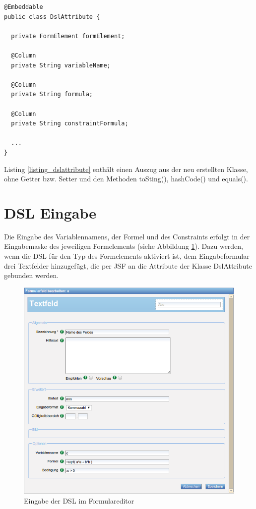 \begin{lstlisting}[float = htbp,caption={Embedded DslAttribute },label=listing_dslattribute]
@Embeddable
public class DslAttribute {

  private FormElement formElement;
  
  @Column
  private String variableName;

  @Column
  private String formula;

  @Column
  private String constraintFormula;

  ...
}
\end{lstlisting}


Listing \ref{listing_dslattribute} enthält einen Auszug aus der neu erstellten Klasse, ohne Getter bzw. Setter und den Methoden toSting(), hashCode() und equals().

\section{DSL Eingabe}
\label{implementierung_dsl_eingabe}

Die Eingabe des Variablennamens, der Formel und des Constraints erfolgt in der Eingabemaske des jeweiligen Formelements (siehe Abbildung \ref{abb_screenshot_spics_eingabe}). Dazu werden, wenn die DSL für den Typ des Formelements aktiviert ist, dem Eingabeformular drei Textfelder hinzugefügt, die per JSF an die Attribute der Klasse DslAttribute gebunden werden.


\begin{figure}[h]
\begin{center}
 \includegraphics[scale=0.5]{figures/screenshot_spics_eingabe_neu}
\end{center}
\caption{Eingabe der DSL im Formulareditor}
\label{abb_screenshot_spics_eingabe}
\end{figure}

